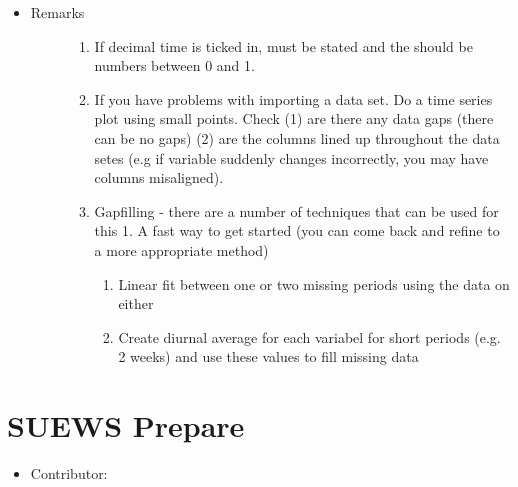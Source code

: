 \documentclass[letterpaper,10pt,english]{sphinxmanual}
\begin{document}
\begin{itemize}
\item {} \begin{description}
\item[{Remarks}] \leavevmode\begin{enumerate}
\item {} 
If decimal time is ticked in,  must be stated and the  should be numbers between 0 and 1.

\item {} 
If you have problems with importing a data set. Do a time series plot using small points. Check (1) are there any data gaps (there can be no gaps) (2) are the columns lined up throughout the data setes (e.g if variable suddenly changes incorrectly, you may have columns misaligned).

\item {} 
Gapfilling - there are a number of techniques that can be used for this
1. A fast way to get started (you can come back and refine to a more appropriate method)
\begin{enumerate}
\item {} 
Linear fit between one or two missing periods using the data on either

\item {} 
Create diurnal average for each variabel for short periods (e.g. 2 weeks) and use these values to fill missing data

\end{enumerate}

\end{enumerate}

\end{description}

\end{itemize}


\section{SUEWS Prepare}
\label{\detokenize{pre-processor/SUEWS Prepare:suews-prepare}}\label{\detokenize{pre-processor/SUEWS Prepare:suewsprepare}}\label{\detokenize{pre-processor/SUEWS Prepare::doc}}\begin{itemize}
\item {} 
Contributor:

\end{itemize}
\end{document}
